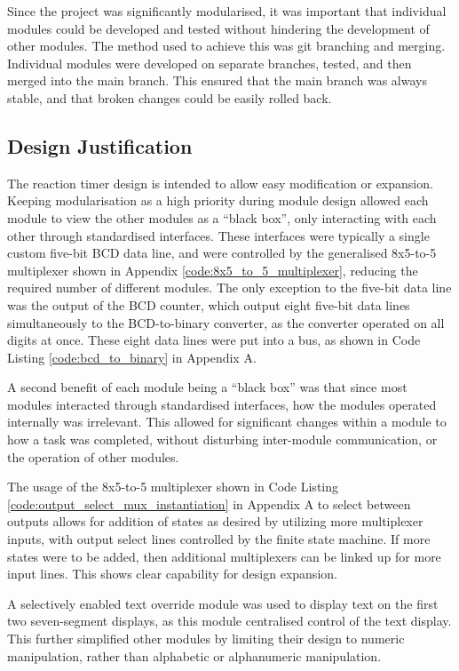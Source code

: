 \documentclass[11pt]{article}
\begin{document}
Since the project was significantly modularised, it was important that individual modules could be developed and tested without hindering the development of other modules. The method used to achieve this was git branching and merging. Individual modules were developed on separate branches, tested, and then merged into the main branch. This ensured that the main branch was always stable, and that broken changes could be easily rolled back.

\subsection{Design Justification}

The reaction timer design is intended to allow easy modification or expansion. Keeping modularisation as a high priority during module design allowed each module to view the other modules as a ``black box'', only interacting with each other through standardised interfaces. These interfaces were typically a single custom five-bit BCD data line, and were controlled by the generalised 8x5-to-5 multiplexer shown in Appendix \ref{code:8x5_to_5_multiplexer}, reducing the required number of different modules. The only exception to the five-bit data line was the output of the BCD counter, which output eight five-bit data lines simultaneously to the BCD-to-binary converter, as the converter operated on all digits at once. These eight data lines were put into a bus, as shown in Code Listing \ref{code:bcd_to_binary} in Appendix A.

A second benefit of each module being a ``black box'' was that since most modules interacted through standardised interfaces, how the modules operated internally was irrelevant. This allowed for significant changes within a module to how a task was completed, without disturbing inter-module communication, or the operation of other modules.

The usage of the 8x5-to-5 multiplexer shown in Code Listing \ref{code:output_select_mux_instantiation} in Appendix A to select between outputs allows for addition of states as desired by utilizing more multiplexer inputs, with output select lines controlled by the finite state machine. If more states were to be added, then additional multiplexers can be linked up for more input lines. This shows clear capability for design expansion.

A selectively enabled text override module was used to display text on the first two seven-segment displays,  as this module centralised control of the text display. This further simplified other modules by limiting their design to numeric manipulation, rather than alphabetic or alphanumeric manipulation. 
\end{document}
